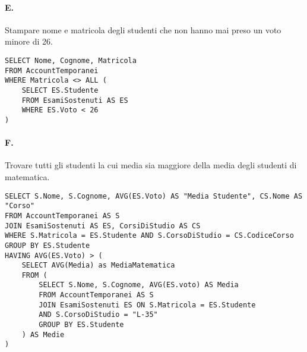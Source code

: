 \newpage
\paragraph{E.}
Stampare nome e matricola degli studenti che non hanno mai preso
un voto minore di 26.

\begin{verbatim}
SELECT Nome, Cognome, Matricola
FROM AccountTemporanei
WHERE Matricola <> ALL (
    SELECT ES.Studente
    FROM EsamiSostenuti AS ES
    WHERE ES.Voto < 26
)
\end{verbatim}

\paragraph{F.}
Trovare tutti gli studenti la cui media sia maggiore della media
degli studenti di matematica.

\begin{verbatim}
SELECT S.Nome, S.Cognome, AVG(ES.Voto) AS "Media Studente", CS.Nome AS "Corso"
FROM AccountTemporanei AS S
JOIN EsamiSostenuti AS ES, CorsiDiStudio AS CS
WHERE S.Matricola = ES.Studente AND S.CorsoDiStudio = CS.CodiceCorso
GROUP BY ES.Studente
HAVING AVG(ES.Voto) > (
    SELECT AVG(Media) as MediaMatematica
	FROM (
        SELECT S.Nome, S.Cognome, AVG(ES.voto) AS Media
		FROM AccountTemporanei AS S
		JOIN EsamiSostenuti ES ON S.Matricola = ES.Studente
        AND S.CorsoDiStudio = "L-35"
		GROUP BY ES.Studente
	) AS Medie
)
\end{verbatim}
